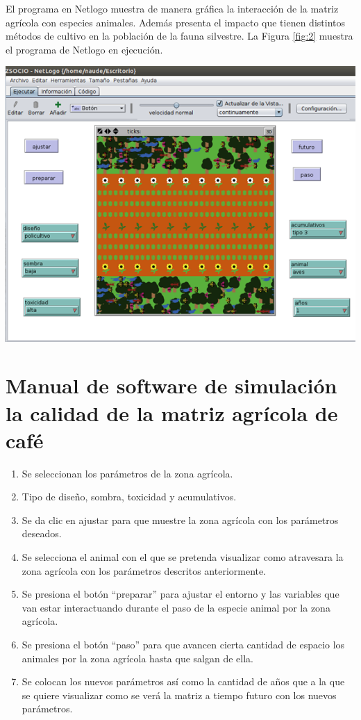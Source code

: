 El programa en Netlogo muestra de manera gráfica la interacción de la matriz agrícola con especies animales. Además presenta el impacto que tienen distintos métodos de cultivo en la población de la fauna silvestre. La Figura \ref{fig:2} muestra el programa de Netlogo en ejecución.

\begin{center}
\includegraphics[scale=0.45]{imagenes/4-agricola/2}
\label{fig:2}
\end{center}

\section{Manual de software de simulación la calidad de la matriz agrícola de café}
\begin{enumerate}
\item Se seleccionan los parámetros de la zona agrícola.

\item Tipo de diseño, sombra, toxicidad y acumulativos.

\item Se da clic en ajustar para que muestre la zona agrícola con los parámetros deseados.

\item Se selecciona el animal con el que se pretenda visualizar como atravesara la zona agrícola con los parámetros descritos anteriormente.

\item Se presiona el botón ``preparar'' para ajustar el entorno y las variables que van estar interactuando durante el paso de la especie animal por la zona agrícola.

\item Se presiona el botón ``paso'' para que avancen cierta cantidad de espacio los animales por la zona agrícola hasta que salgan de ella.

\item Se colocan los nuevos parámetros así como la cantidad de años que a la que se quiere visualizar como se verá la matriz a tiempo futuro con los nuevos parámetros.
\end{enumerate}

